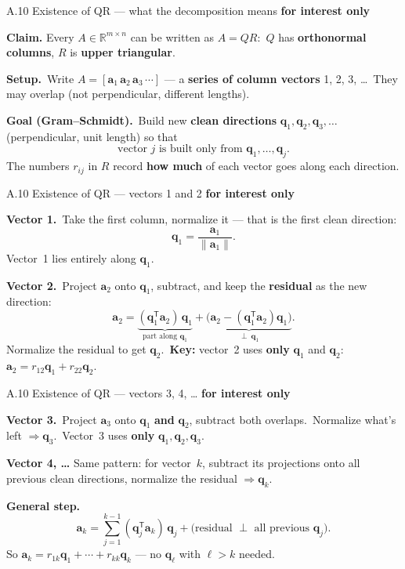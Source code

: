 \documentclass[11pt,aspectratio=169]{beamer}
\newcommand{\InterestOnly}{\textcolor{mAccent}{\textbf{for interest only}}}
\begin{document}
\begin{frame}{A.10 Existence of QR --- what the decomposition means}
  \hypertarget{sec:qr-exists}{}
  \footnotesize
  \InterestOnly

  \medskip
  \textbf{Claim.} Every $A\in\mathbb{R}^{m\times n}$ can be written as $A=QR$:\
  $Q$ has \textbf{orthonormal columns}, $R$ is \textbf{upper triangular}.

  \medskip
  \textbf{Setup.}\
  Write $A=[\mathbf{a}_1\,\mathbf{a}_2\,\mathbf{a}_3\,\cdots]$ --- a \textbf{series of column vectors} 1, 2, 3, \ldots\
  They may overlap (not perpendicular, different lengths).

  \medskip
  \textbf{Goal (Gram--Schmidt).}\
  Build new \textbf{clean directions} $\mathbf{q}_1,\mathbf{q}_2,\mathbf{q}_3,\ldots$ (perpendicular, unit length) so that
  \[
    \text{vector } j \text{ is built only from } \mathbf{q}_1,\ldots,\mathbf{q}_j.
  \]
  The numbers $r_{ij}$ in $R$ record \textbf{how much} of each vector goes along each direction.
\end{frame}

\begin{frame}{A.10 Existence of QR --- vectors 1 and 2}
  \footnotesize
  \InterestOnly

  \medskip
  \textbf{Vector 1.}\
  Take the first column, normalize it --- that is the first clean direction:
  \[
    \mathbf{q}_1=\frac{\mathbf{a}_1}{\|\mathbf{a}_1\|}.
  \]
  Vector~1 lies entirely along $\mathbf{q}_1$.

  \medskip
  \textbf{Vector 2.}\
  Project $\mathbf{a}_2$ onto $\mathbf{q}_1$, subtract, and keep the \textbf{residual} as the new direction:
  \[
    \mathbf{a}_2=
    \underbrace{(\mathbf{q}_1^{\mathsf T}\mathbf{a}_2)\,\mathbf{q}_1}_{\text{part along }\mathbf{q}_1}
    +\underbrace{\bigl(\mathbf{a}_2-(\mathbf{q}_1^{\mathsf T}\mathbf{a}_2)\mathbf{q}_1\bigr)}_{\perp\ \mathbf{q}_1}.
  \]
  Normalize the residual to get $\mathbf{q}_2$.\
  \textbf{Key:} vector~2 uses \textbf{only} $\mathbf{q}_1$ and $\mathbf{q}_2$:
  $\mathbf{a}_2=r_{12}\mathbf{q}_1+r_{22}\mathbf{q}_2$.
\end{frame}

\begin{frame}{A.10 Existence of QR --- vectors 3, 4, \ldots}
  \footnotesize
  \InterestOnly

  \medskip
  \textbf{Vector 3.}\
  Project $\mathbf{a}_3$ onto $\mathbf{q}_1$ \textbf{and} $\mathbf{q}_2$, subtract both overlaps.\
  Normalize what's left $\Rightarrow\mathbf{q}_3$.\
  Vector~3 uses \textbf{only} $\mathbf{q}_1,\mathbf{q}_2,\mathbf{q}_3$.

  \medskip
  \textbf{Vector 4, \ldots} Same pattern: for vector~$k$, subtract its projections onto all previous clean directions, normalize the residual $\Rightarrow\mathbf{q}_k$.

  \medskip
  \textbf{General step.}
  \[
    \mathbf{a}_k=
    \sum_{j=1}^{k-1}(\mathbf{q}_j^{\mathsf T}\mathbf{a}_k)\,\mathbf{q}_j
    +\text{(residual $\perp$ all previous $\mathbf{q}_j$)}.
  \]
  So $\mathbf{a}_k=r_{1k}\mathbf{q}_1+\cdots+r_{kk}\mathbf{q}_k$ --- no $\mathbf{q}_\ell$ with $\ell>k$ needed.
\end{frame}
\end{document}
